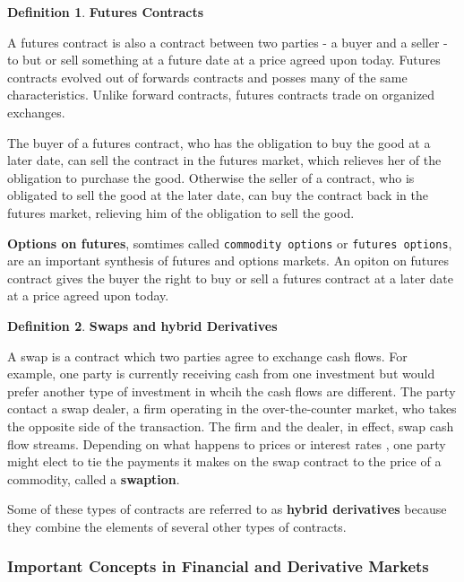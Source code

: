 \documentclass{book}
\theoremstyle{definition}
\newtheorem{definition}{Definition}[section]
\theoremstyle{remark}
\begin{document}
    \begin{definition} {\textbf{Futures Contracts}}
        
        A futures contract is also a contract between two parties - a buyer and a seller - to but or sell something at a future date at a price agreed upon today. Futures contracts evolved out of forwards contracts and posses many of the same characteristics. Unlike forward contracts, futures contracts trade on organized exchanges.  
        
        The buyer of a futures contract, who has the obligation to buy the good at a later date, can sell the contract in the futures market, which relieves her of the obligation to purchase the good. Otherwise the seller of a contract, who is obligated to sell the good at the later date, can buy the contract back in the futures market, relieving him of the obligation to sell the good.  
        
        
        \textbf{Options on futures}, somtimes called \texttt{commodity options} or \texttt{futures options}, are an important synthesis of futures and options markets. An opiton on futures contract gives the buyer the right to buy or sell a futures contract at a later date at a price agreed upon today. 
    \end{definition}
    
    \begin{definition}{\textbf{Swaps and hybrid Derivatives}}
        
        A swap is a contract which two parties agree to exchange cash flows. For example, one party is currently receiving cash from one investment but would prefer another type of investment in whcih the cash flows are different. The party contact a swap dealer, a firm operating in the over-the-counter market, who takes the opposite side of the transaction. The firm and the dealer, in effect, swap cash flow streams. Depending on what happens to prices or interest rates , one party might elect to tie the payments it makes on the swap contract to the price of a commodity, called a \textbf{swaption}.
        
        Some of these types of contracts are referred to as \textbf{hybrid derivatives} because they combine the elements of several other types of contracts. 
    \end{definition}

\subsubsection{Important Concepts in Financial and Derivative Markets}
    
\end{document}
